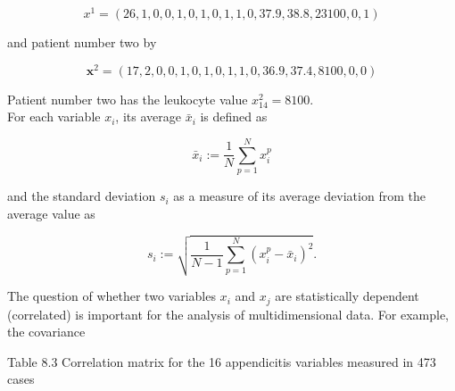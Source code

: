 \documentclass[10pt]{book}
\begin{document}
$$
x^{1}=(26,1,0,0,1,0,1,0,1,1,0,37.9,38.8,23100,0,1)
$$

and patient number two by

$$
\boldsymbol{x}^{2}=(17,2,0,0,1,0,1,0,1,1,0,36.9,37.4,8100,0,0)
$$

Patient number two has the leukocyte value $x_{14}^{2}=8100$.\\
For each variable $x_{i}$, its average $\bar{x}_{i}$ is defined as

$$
\bar{x}_{i}:=\frac{1}{N} \sum_{p=1}^{N} x_{i}^{p}
$$

and the standard deviation $s_{i}$ as a measure of its average deviation from the average value as

$$
s_{i}:=\sqrt{\frac{1}{N-1} \sum_{p=1}^{N}\left(x_{i}^{p}-\bar{x}_{i}\right)^{2}} .
$$

The question of whether two variables $x_{i}$ and $x_{j}$ are statistically dependent (correlated) is important for the analysis of multidimensional data. For example, the covariance

Table 8.3 Correlation matrix for the 16 appendicitis variables measured in 473 cases
\end{document}
